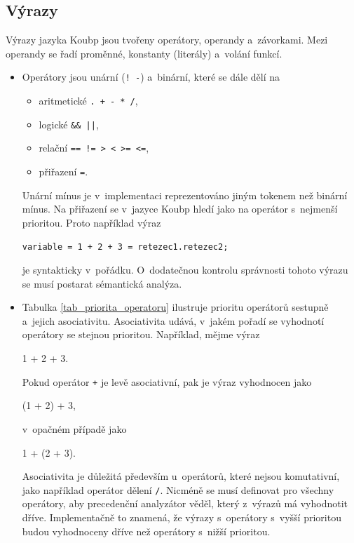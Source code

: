 \subsection*{Výrazy}
Výrazy jazyka Koubp jsou tvořeny operátory, operandy a~závorkami.
Mezi operandy se řadí proměnné, konstanty (literály) a~volání funkcí.

\begin{itemize}
    \item Operátory jsou unární (\texttt{! -}) a~binární, které se dále dělí na
    \begin{itemize}[label=$\circ$]
        \item aritmetické \texttt{. + - * /},
        \item logické \texttt{\&\& ||},
        \item relační \texttt{== != > < >= <=},
        \item přiřazení \texttt{=}.
    \end{itemize}
    Unární mínus je v~implementaci reprezentováno jiným tokenem než binární mínus.
    Na přiřazení se v~jazyce Koubp hledí jako na operátor s~nejmenší prioritou.
    Proto například výraz
    \begin{center}
        \texttt{variable = 1 + 2 + 3 = retezec1.retezec2;}
    \end{center}
    je syntakticky v~pořádku.
    O~dodatečnou kontrolu správnosti tohoto výrazu se musí postarat sémantická analýza. 
    \item Tabulka \ref{tab_priorita_operatoru} ilustruje prioritu operátorů sestupně a~jejich asociativitu.
    Asociativita udává, v~jakém pořadí se vyhodnotí operátory se stejnou prioritou.
    Například, mějme výraz
    \begin{center}
        1 + 2 + 3.
    \end{center}
    Pokud operátor \texttt{+} je levě asociativní, pak je výraz vyhodnocen jako
    \begin{center}
        (1 + 2) + 3,
    \end{center}
    v~opačném případě jako
    \begin{center}
        1 + (2 + 3).
    \end{center}
    Asociativita je důležitá především u~operátorů, které nejsou komutativní, jako například operátor dělení \texttt{/}.
    Nicméně se musí definovat pro všechny operátory, aby precedenční analyzátor věděl, který z~výrazů má vyhodnotit dříve.
    Implementačně to znamená, že výrazy s~operátory s~vyšší prioritou budou vyhodnoceny dříve než operátory s~nižší prioritou.

\end{itemize}
